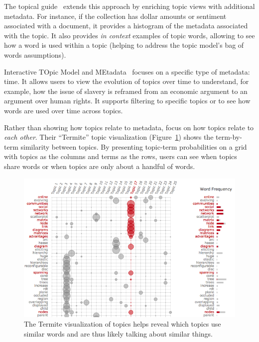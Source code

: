 The topical guide~\citep{gardner-10} extends this approach by enriching topic
views with additional metadata.  For instance, if the collection has dollar
amounts or sentiment~\citep{pang-08} associated with a document, it provides a
histogram of the metadata associated with the topic.  It also provides \emph{in
  context} examples of topic words, allowing to see how a word is used within a
topic (helping to address the topic model's bag of words assumptions).

Interactive TOpic Model and MEtadata~\citep[Interactive TOpic Model and MEtadata]{eistenstein-14} focuses on a specific type of metadata: time.
It allows users to view the evolution of topics over time to understand, for
example, how the issue of slavery is reframed from an economic argument to an
argument over human rights.  It supports filtering to specific topics or to see
how words are used over time across topics.

Rather than showing how topics relate to metadata,
\citet{chuang-12} focus on how topics relate to \emph{each other}.
Their ``Termite'' topic visualization (Figure~\ref{fig:termite}) shows
the term-by-term similarity between topics.  By presenting topic-term
probabilities on a grid with topics as the columns and terms as the
rows, users can see when topics share words or when topics are only
about a handful of words.

\begin{figure}
  \includegraphics[width=.9\linewidth]{figures/viz_termite}
  \caption{The Termite visualization of topics helps reveal which
    topics use similar words and are thus likely talking about similar
    things.}
  \label{fig:termite}
\end{figure}

